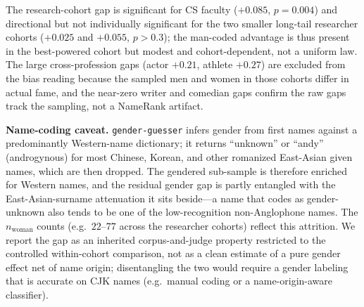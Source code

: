 The research-cohort gap is significant for CS faculty ($+0.085$, $p=0.004$) and directional but not individually significant for the two smaller long-tail researcher cohorts ($+0.025$ and $+0.055$, $p>0.3$); the man-coded advantage is thus present in the best-powered cohort but modest and cohort-dependent, not a uniform law. The large cross-profession gaps (actor $+0.21$, athlete $+0.27$) are excluded from the bias reading because the sampled men and women in those cohorts differ in actual fame, and the near-zero writer and comedian gaps confirm the raw gaps track the sampling, not a NameRank artifact.

\textbf{Name-coding caveat.} \texttt{gender-guesser} infers gender from first names against a predominantly Western-name dictionary; it returns ``unknown'' or ``andy'' (androgynous) for most Chinese, Korean, and other romanized East-Asian given names, which are then dropped. The gendered sub-sample is therefore enriched for Western names, and the residual gender gap is partly entangled with the East-Asian-surname attenuation it sits beside---a name that codes as gender-unknown also tends to be one of the low-recognition non-Anglophone names. The $n_\text{woman}$ counts (e.g.\ $22$--$77$ across the researcher cohorts) reflect this attrition. We report the gap as an inherited corpus-and-judge property restricted to the controlled within-cohort comparison, not as a clean estimate of a pure gender effect net of name origin; disentangling the two would require a gender labeling that is accurate on CJK names (e.g.\ manual coding or a name-origin-aware classifier).


